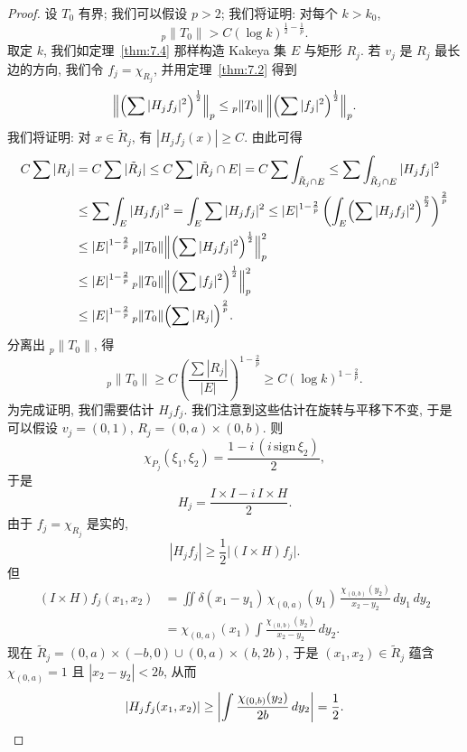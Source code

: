 \begin{proof}
设 $T_0$ 有界; 我们可以假设 $p>2$; 我们将证明: 对每个 $k>k_0$,
\[
{}_{p}\|T_{0}\|>C(\log k)^{\frac{1}{2}-\frac{1}{p}}.
\]
取定 $k$, 我们如定理~\ref{thm:7.4} 那样构造 Kakeya 集 $E$ 与矩形 $R_j$. 若 $v_j$ 是 $R_j$ 最长边的方向, 我们令 $f_j=\chi_{R_j}$, 并用定理~\ref{thm:7.2} 得到
\[
\Bigl\|\Bigl(\sum|H_{j}f_{j}|^{2}\Bigr)^{\frac{1}{2}}\Bigr\|_{p}
\leq{}_{p}\|T_{0}\|\,\Bigl\|\Bigl(\sum|f_{j}|^{2}\Bigr)^{\frac{1}{2}}\Bigr\|_{p}.
\]
我们将证明: 对 $x\in\tilde{R}_j$, 有 $|H_jf_j(x)|\geq C$. 由此可得
\begin{align*}
C\sum|R_{j}|&=C\sum|\tilde{R}_{j}|\leq C\sum|\tilde{R}_{j}\cap E|
=C\sum\int_{\tilde{R}_{j}\cap E}\leq\sum\int_{\tilde{R}_{j}\cap E}|H_{j}f_{j}|^{2} \\
&\leq\sum\int_{E}|H_{j}f_{j}|^{2}=\int_{E}\sum|H_{j}f_{j}|^{2}
\leq|E|^{1-\frac{2}{p}}\left(\int_{E}\Bigl(\sum|H_{j}f_{j}|^{2}\Bigr)^{\frac{p}{2}}\right)^{\frac{2}{p}} \\
&\leq|E|^{1-\frac{2}{p}}\,{}_p\|T_{0}\|\Bigl\|\Bigl(\sum|H_{j}f_{j}|^{2}\Bigr)^{\frac{1}{2}}\Bigr\|_{p}^{2} \\
&\leq|E|^{1-\frac{2}{p}}\,{}_p\|T_{0}\|\Bigl\|\Bigl(\sum|f_{j}|^{2}\Bigr)^{\frac{1}{2}}\Bigr\|_{p}^{2} \\
&\leq|E|^{1-\frac{2}{p}}\,{}_p\|T_{0}\|\Bigl(\sum|R_{j}|\Bigr)^{\frac{2}{p}}.
\end{align*}
分离出 ${}_p\|T_0\|$, 得
\[
{}_{p}\|T_{0}\|\geq C\left(\frac{\sum|R_{j}|}{|E|}\right)^{1-\frac{2}{p}}
\geq C(\log k)^{1-\frac{2}{p}}.
\]
为完成证明, 我们需要估计 $H_jf_j$. 我们注意到这些估计在旋转与平移下不变, 于是可以假设 $v_j=(0,1)$, $R_j=(0,a)\times(0,b)$. 则
\[
\chi_{P_{j}}(\xi_{1},\xi_{2})=\frac{1-i\,(i\,\mathrm{sign}\,\xi_{2})}{2},
\]
于是
\[
H_{j}=\frac{I\times I-i\,I\times H}{2}.
\]
由于 $f_{j}=\chi_{R_{j}}$ 是实的,
\[
|H_{j}f_{j}|\geq\frac{1}{2}\bigl|(I\times H)f_{j}\bigr|.
\]
但
\begin{align*}
(I\times H)f_{j}(x_{1},x_{2})
&=\iint\delta(x_{1}-y_{1})\,\chi_{(0,a)}(y_{1})\,\frac{\chi_{(0,b)}(y_{2})}{x_{2}-y_{2}}\,dy_{1}\,dy_{2} \\
&=\chi_{(0,a)}(x_{1})\int\frac{\chi_{(0,b)}(y_{2})}{x_{2}-y_{2}}\,dy_{2}.
\end{align*}
现在 $\tilde{R}_j=(0,a)\times(-b,0)\cup(0,a)\times(b,2b)$, 于是 $(x_1,x_2)\in\tilde{R}_j$ 蕴含 $\chi_{(0,a)}=1$ 且 $|x_2-y_2|<2b$, 从而
\[
|H_{j}f_{j}(x_{1},x_{2})|\geq\left|\int\frac{\chi_{(0,b)}(y_{2})}{2b}\,dy_{2}\right|=\frac{1}{2}. \qedhere
\]
\end{proof}

